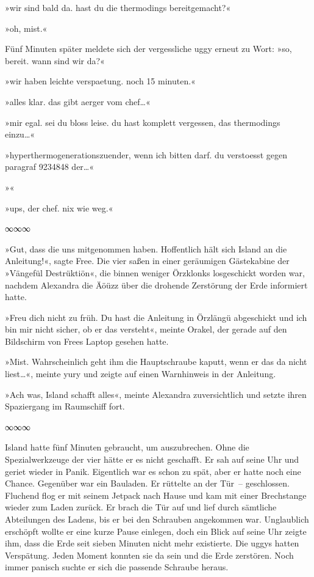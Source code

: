 »wir sind bald da. hast du die thermodings bereitgemacht?«

»oh, mist.«

Fünf Minuten später meldete sich der vergessliche uggy erneut zu Wort: »so, bereit. wann sind wir da?«

»wir haben leichte verspaetung. noch 15 minuten.«

»alles klar. das gibt aerger vom chef…«

»mir egal. sei du bloss leise. du hast komplett vergessen, das thermodings einzu…«

»hyperthermogenerationszuender, wenn ich bitten darf. du verstoesst gegen paragraf 9234848 der…«

»«

»ups, der chef. nix wie weg.«

\begin{center}
    ∞∞∞
\end{center}

»Gut, dass die uns mitgenommen haben. Hoffentlich hält sich Island an die Anleitung!«, sagte Free. Die vier saßen in einer geräumigen Gästekabine der »Vängefül Destrüktiön«, die binnen weniger Örzklonks losgeschickt worden war, nachdem Alexandra die Äöüzz über die drohende Zerstörung der Erde informiert hatte.

»Freu dich nicht zu früh. Du hast die Anleitung in Örzlängü abgeschickt und ich bin mir nicht sicher, ob er das versteht«, meinte Orakel, der gerade auf den Bildschirm von Frees Laptop gesehen hatte.

»Mist. Wahrscheinlich geht ihm die Hauptschraube kaputt, wenn er das da nicht liest…«, meinte yury und zeigte auf einen Warnhinweis in der Anleitung.

»Ach was, Island schafft alles«, meinte Alexandra zuversichtlich und setzte ihren Spaziergang im Raumschiff fort.

\begin{center}
    ∞∞∞
\end{center}

Island hatte fünf Minuten gebraucht, um auszubrechen. Ohne die Spezialwerkzeuge der vier hätte er es nicht geschafft. Er sah auf seine Uhr und geriet wieder in Panik. Eigentlich war es schon zu spät, aber er hatte noch eine Chance. Gegenüber war ein Bauladen. Er rüttelte an der Tür~– geschlossen. Fluchend flog er mit seinem Jetpack nach Hause und kam mit einer Brechstange wieder zum Laden zurück. Er brach die Tür auf und lief durch sämtliche Abteilungen des Ladens, bis er bei den Schrauben angekommen war. Unglaublich erschöpft wollte er eine kurze Pause einlegen, doch ein Blick auf seine Uhr zeigte ihm, dass die Erde seit sieben Minuten nicht mehr existierte. Die uggys hatten Verspätung. Jeden Moment konnten sie da sein und die Erde zerstören. Noch immer panisch suchte er sich die passende Schraube heraus.

